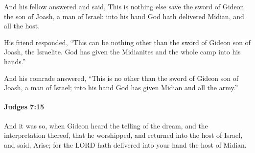 			\begin{versebox}
					\item[BHS] 
					\item[ASV] And his fellow answered and said, This is nothing else save the sword of Gideon the son of Joash, a man of Israel: into his hand God hath delivered Midian, and all the host.
					\item[NIV] His friend responded, “This can be nothing other than the sword of Gideon son of Joash, the Israelite. God has given the Midianites and the whole camp into his hands.”
					\item[NRSV] And his comrade answered, “This is no other than the sword of Gideon son of Joash, a man of Israel; into his hand God has given Midian and all the army.”
			\end{versebox}

		\paragraph{Judges 7:15} %
			\label{JUDGES-7-15}

			And it was so, when Gideon heard the telling of the dream, and the interpretation thereof, that he worshipped, and returned into the host of Israel, and said, Arise; for the LORD hath delivered into your hand the host of Midian.

